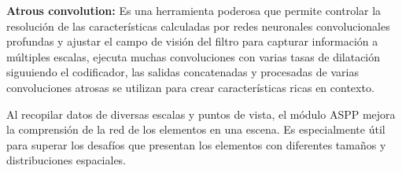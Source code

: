 	
	\textbf{Atrous convolution: }  Es una herramienta poderosa que permite controlar la resolución de las características calculadas por redes neuronales convolucionales profundas y ajustar el campo de visión del filtro para capturar información a múltiples escalas, ejecuta muchas convoluciones con varias tasas de dilatación siguuiendo el codificador, las salidas concatenadas y procesadas de varias convoluciones atrosas se utilizan para crear características ricas en contexto.
	
	Al recopilar datos de diversas escalas y puntos de vista, el módulo ASPP mejora la comprensión de la red de los elementos en una escena. Es especialmente útil para superar los desafíos que presentan los elementos con diferentes tamaños y distribuciones espaciales.
	
\singlespacing
